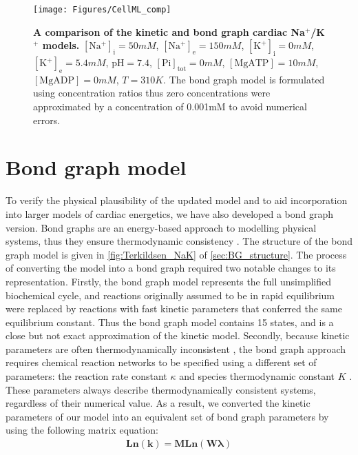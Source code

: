 \documentclass[11pt]{article}
\newcounter{num}
\begin{document}
\begin{figure}
	\centering
	\texttt{[image: Figures/CellML\_comp]}
	\caption{\textbf{A comparison of the kinetic and bond graph cardiac Na$^+$/K$^+$ models.} $\mathrm{[Na^+]_i} = 50\si{mM}$, $\mathrm{[Na^+]_e} = 150\si{mM}$, $\mathrm{[K^+]_i} = 0\si{mM}$, $\mathrm{[K^+]_e} = 5.4\si{mM}$, $\mathrm{pH} = 7.4$, $\mathrm{[Pi]_{tot}} = 0\si{mM}$, $\mathrm{[MgATP]} = 10\si{mM}$, $\mathrm{[MgADP]} = 0\si{mM}$, $T = 310\si{K}$.  The bond graph model is formulated using concentration ratios thus zero concentrations were approximated by a concentration of 0.001mM to avoid numerical errors.}
	\label{fig:kinetic_BG_comp}
\end{figure}

\section{Bond graph model}
To verify the physical plausibility of the updated model and to aid incorporation into larger models of cardiac energetics, we have also developed a bond graph version. Bond graphs are an energy-based approach to modelling physical systems, thus they ensure thermodynamic consistency \citep{gawthrop_energy-based_2014}. The structure of the bond graph model is given in \autoref{fig:Terkildsen_NaK} of \autoref{sec:BG_structure}. The process of converting the model into a bond graph required two notable changes to its representation. Firstly, the bond graph model represents the full unsimplified biochemical cycle, and reactions originally assumed to be in rapid equilibrium were replaced by reactions with fast kinetic parameters that conferred the same equilibrium constant. Thus the bond graph model contains 15 states, and is a close but not exact approximation of the kinetic model. Secondly, because kinetic parameters are often thermodynamically inconsistent \citep{liebermeister_modular_2010}, the bond graph approach requires chemical reaction networks to be specified using a different set of parameters: the reaction rate constant $\kappa$ and species thermodynamic constant $K$ \citep{gawthrop_energy-based_2014}. These parameters always describe thermodynamically consistent systems, regardless of their numerical value. As a result, we converted the kinetic parameters of our model into an equivalent set of bond graph parameters \citep{gawthrop_hierarchical_2015} by using the following matrix equation:
\begin{align}
	\textbf{Ln}(\mathbf{k}) = \mathbf{M} \textbf{Ln}(\mathbf{W} \boldsymbol{\lambda}) \label{eq:bg_general}
\end{align}
\end{document}
